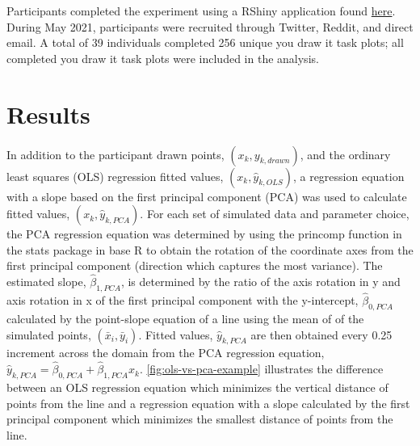 \documentclass[12pt]{article}
\begin{document}
Participants completed the experiment using a RShiny application found
\href{https://shiny.srvanderplas.com/you-draw-it/}{here}. During May
2021, participants were recruited through Twitter, Reddit, and direct
email. A total of 39 individuals completed 256 unique you draw it task
plots; all completed you draw it task plots were included in the
analysis.

\hypertarget{results}{%
\section{Results}\label{results}}

In addition to the participant drawn points, \((x_k, y_{k,drawn})\), and
the ordinary least squares (OLS) regression fitted values,
\((x_k, \hat y_{k,OLS})\), a regression equation with a slope based on
the first principal component (PCA) was used to calculate fitted values,
\((x_k, \hat y_{k,PCA})\). For each set of simulated data and parameter
choice, the PCA regression equation was determined by using the princomp
function in the stats package in base R to obtain the rotation of the
coordinate axes from the first principal component (direction which
captures the most variance). The estimated slope, \(\hat\beta_{1,PCA}\),
is determined by the ratio of the axis rotation in y and axis rotation
in x of the first principal component with the y-intercept,
\(\hat\beta_{0,PCA}\) calculated by the point-slope equation of a line
using the mean of of the simulated points, \((\bar x_i, \bar y_i)\).
Fitted values, \(\hat y_{k,PCA}\) are then obtained every 0.25 increment
across the domain from the PCA regression equation,
\(\hat y_{k,PCA} = \hat\beta_{0,PCA} + \hat\beta_{1,PCA} x_k\).
\cref{fig:ols-vs-pca-example} illustrates the difference between an OLS
regression equation which minimizes the vertical distance of points from
the line and a regression equation with a slope calculated by the first
principal component which minimizes the smallest distance of points from
the line.
\end{document}

